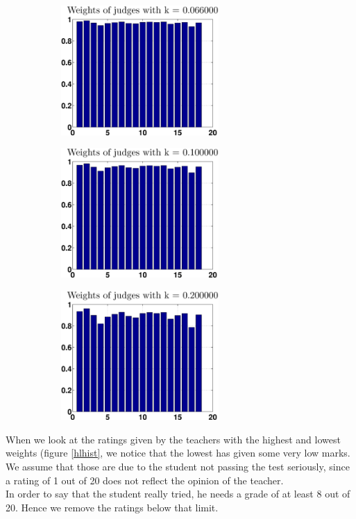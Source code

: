 \documentclass[12pt,a4paper]{article}
\begin{document}
\begin{figure}[h!]
\centering
\begin{subfigure}[b]{0.48\textwidth}
\includegraphics[width = 6cm]{preprocess/ppweightsk660.eps}
\end{subfigure}
\begin{subfigure}[b]{0.48\textwidth}
\includegraphics[width = 6cm]{preprocess/ppweightsk1000.eps}
\end{subfigure}
\begin{subfigure}[b]{0.5\textwidth}
\includegraphics[width = 6cm]{preprocess/ppweightsk2000.eps}
\end{subfigure}
\caption{\label{weightprocess}}
\end{figure}

When we look at the ratings given by the teachers with the highest and lowest weights (figure \ref{hlhist}, we notice that the lowest has given some very low marks. We assume that those are due to the student not passing the test seriously, since a rating of 1 out of 20 does not reflect the opinion of the teacher.\\
In order to say that the student really tried, he needs a grade of at least 8 out of 20. Hence we remove the ratings below that limit.
\end{document}
